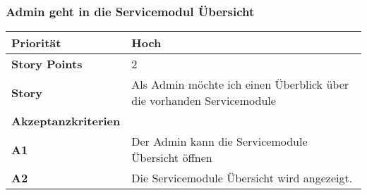  \subsubsection{Admin geht in die Servicemodul Übersicht}

 \begin{tabularx}{\linewidth}{l X}
\textbf{Priorität} & Hoch\\
 \hline
 \textbf{Story Points} & 2\\
 \hline
 \textbf{Story}& Als Admin möchte ich einen Überblick über die vorhanden Servicemodule\\
 \hline
 \textbf{Akzeptanzkriterien} & \\
 \hline
  \textbf{A1} & Der Admin kann die Servicemodule Übersicht öffnen\\
 \hline
\textbf{A2} & Die Servicemodule Übersicht wird angezeigt.\\
  \hline
 \end{tabularx}